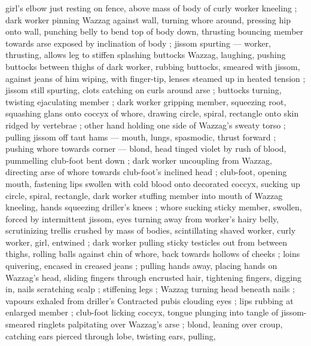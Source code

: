 girl's elbow just resting on fence, above mass of body of curly worker kneeling ; dark worker pinning Wazzag against wall, turning whore around, pressing hip onto wall, punching belly to bend top of body down, thrusting bouncing member towards arse exposed by inclination of body ; jissom spurting --- worker, thrusting, allows leg to stiffen {\dashcom} splashing buttocks {\col} Wazzag, laughing, pushing buttocks between thighs of dark worker, rubbing buttocks, smeared with jissom, against jeans of him wiping, with finger-tip, lenses steamed up in heated tension ; jissom still spurting, clots catching on curls around arse ; buttocks turning, twisting ejaculating member ; dark worker gripping member, squeezing root, squashing glans onto coccyx of whore, drawing circle, spiral, rectangle onto skin ridged by vertebrae ; other hand holding one side of Wazzag's sweaty torso ; pulling jissom off taut hams --- mouth, lungs, spasmodic, thrust forward ; pushing whore towards corner --- blond, head tinged violet by rush of blood, pummelling club-foot bent down ; dark worker uncoupling from Wazzag, directing arse of whore towards club-foot's inclined head ; club-foot, opening mouth, fastening lips swollen with cold blood onto decorated coccyx, sucking up circle, spiral, rectangle, dark worker stuffing member into mouth of Wazzag kneeling, hands squeezing driller's knees ; whore sucking sticky member, swollen, forced by intermittent jissom, eyes turning away from worker's hairy belly, scrutinizing trellis crushed by mass of bodies, scintillating {\col} shaved worker, curly worker, girl, entwined ; dark worker pulling sticky testicles out from between thighs, rolling balls against chin of whore, back towards hollows of cheeks ; loins quivering, encased in creased jeans ; pulling hands away, placing hands on Wazzag's head, sliding fingers through encrusted hair, tightening fingers, digging in, nails scratching scalp ; stiffening legs ; Wazzag turning head beneath nails ; vapours exhaled from driller's Contracted pubis clouding eyes ; lips rubbing at enlarged member ; club-foot licking coccyx, tongue plunging into tangle of jissom-smeared ringlets palpitating over Wazzag's arse ; blond, leaning over croup, catching ears pierced through lobe, twisting ears, pulling, 
